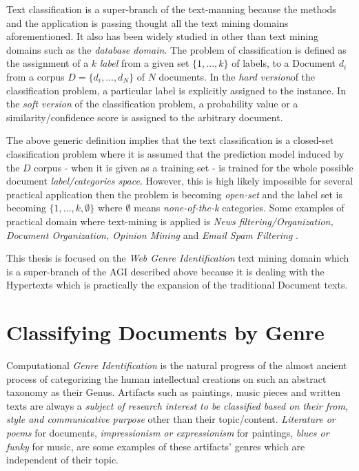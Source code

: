 Text classification is a super-branch of the text-manning because the methods and the application is passing thought all the text mining domains aforementioned. It also has been widely studied in other than text mining domains such as the \textit{database domain}.  The problem of classification is defined as the assignment of a  $k$ \textit{label} from a given set $\{1, ..., k\}$ of labels, to a Document $d_{i}$ from a corpus $D = \{d_{i},...,d_{N} \}$ of $N$ documents. In the \textit{hard version}of the classification problem, a particular label is explicitly assigned to the instance. In the \textit{soft version} of the classification problem, a probability value or a similarity/confidence score is assigned to the arbitrary document.

The above generic definition implies that the text classification is a closed-set classification problem where it is assumed that the prediction model induced by the $D$ corpus - when it is given as a training set - is trained for the whole possible document \textit{label/categories space}. However, this is high likely impossible for several practical application then the problem is becoming \textit{open-set} and the label set is becoming  $\{1, ..., k, \emptyset \}$ where $\emptyset$ means \textit{none-of-the-k} categories. Some examples of practical domain where text-mining is applied is \textit{News filtering/Organization, Document Organization, Opinion Mining} and \textit{Email Spam Filtering} \parencite{Aggarwal2012ASO}.

This thesis is focused on the \textit{Web Genre Identification} text mining domain which is a super-branch of the AGI described above because it is dealing with the Hypertexts which is practically the expansion of the traditional Document texts.

\section{Classifying Documents by Genre} \label{chap:introduction:sec:classifying_by_genre}

Computational \textit{Genre Identification} is the natural progress of the almost ancient process of categorizing the human intellectual creations on such an abstract taxonomy as their Genus. Artifacts such as paintings, music pieces and written texts are always a \textit{subject of research interest to be classified based on their from, style and communicative purpose} other than their topic/content. \textit{Literature or poems} for documents, \textit{impressionism or expressionism} for paintings, \textit{blues or funky} for music, are some examples of these artifacts' genres which are independent of their topic.

